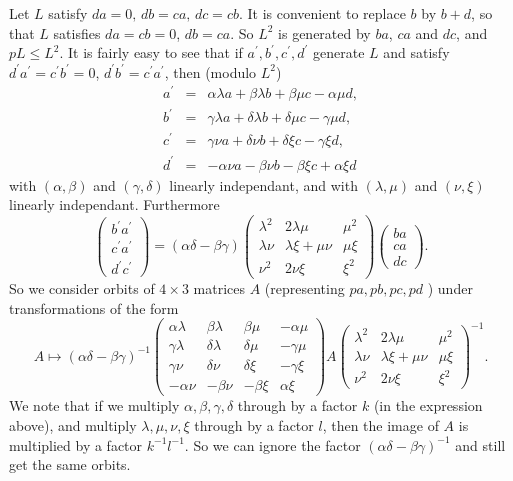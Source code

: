 \documentclass[10pt]{article}
\begin{document}
Let $L$ satisfy $da=0,\,db=ca,\,dc=cb$. It is convenient to replace $b$ by $%
b+d$, so that $L$ satisfies $da=cb=0$, $db=ca$. So $L^{2}$ is generated by $%
ba$, $ca$ and $dc$, and $pL\leq L^{2}$. It is fairly easy to see that if $%
a^{\prime },b^{\prime },c^{\prime },d^{\prime }$ generate $L$ and satisfy $%
d^{\prime }a^{\prime }=c^{\prime }b^{\prime }=0$, $d^{\prime }b^{\prime
}=c^{\prime }a^{\prime }$, then (modulo $L^{2}$) 
\begin{eqnarray*}
a^{\prime } &=&\alpha \lambda a+\beta \lambda b+\beta \mu c-\alpha \mu d, \\
b^{\prime } &=&\gamma \lambda a+\delta \lambda b+\delta \mu c-\gamma \mu d,
\\
c^{\prime } &=&\gamma \nu a+\delta \nu b+\delta \xi c-\gamma \xi d, \\
d^{\prime } &=&-\alpha \nu a-\beta \nu b-\beta \xi c+\alpha \xi d
\end{eqnarray*}%
with $(\alpha ,\beta )$ and $(\gamma ,\delta )$ linearly independant, and
with $(\lambda ,\mu )$ and $(\nu ,\xi )$ linearly independant. Furthermore 
\[
\left( 
\begin{array}{c}
b^{\prime }a^{\prime } \\ 
c^{\prime }a^{\prime } \\ 
d^{\prime }c^{\prime }%
\end{array}%
\right) =(\alpha \delta -\beta \gamma )\left( 
\begin{array}{ccc}
\lambda ^{2} & 2\lambda \mu & \mu ^{2} \\ 
\lambda \nu & \lambda \xi +\mu \nu & \mu \xi \\ 
\nu ^{2} & 2\nu \xi & \xi ^{2}%
\end{array}%
\right) \left( 
\begin{array}{c}
ba \\ 
ca \\ 
dc%
\end{array}%
\right) . 
\]%
So we consider orbits of $4\times 3$ matrices $A$ (representing $pa,pb,pc,pd$%
) under transformations of the form 
\[
A\longmapsto (\alpha \delta -\beta \gamma )^{-1}\left( 
\begin{array}{cccc}
\alpha \lambda & \beta \lambda & \beta \mu & -\alpha \mu \\ 
\gamma \lambda & \delta \lambda & \delta \mu & -\gamma \mu \\ 
\gamma \nu & \delta \nu & \delta \xi & -\gamma \xi \\ 
-\alpha \nu & -\beta \nu & -\beta \xi & \alpha \xi%
\end{array}%
\right) A\left( 
\begin{array}{ccc}
\lambda ^{2} & 2\lambda \mu & \mu ^{2} \\ 
\lambda \nu & \lambda \xi +\mu \nu & \mu \xi \\ 
\nu ^{2} & 2\nu \xi & \xi ^{2}%
\end{array}%
\right) ^{-1}. 
\]%
We note that if we multiply $\alpha ,\beta ,\gamma ,\delta $ through by a
factor $k$ (in the expression above), and multiply $\lambda ,\mu ,\nu ,\xi $
through by a factor $l$, then the image of $A$ is multiplied by a factor $%
k^{-1}l^{-1}$. So we can ignore the factor $(\alpha \delta -\beta \gamma
)^{-1}$ and still get the same orbits.
\end{document}
